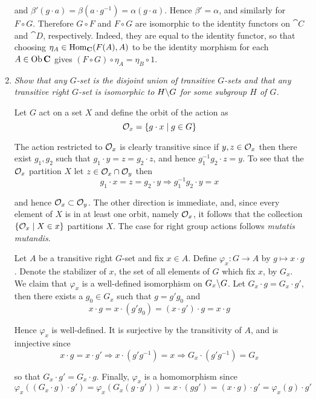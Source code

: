 \documentclass[10pt]{article}
\begin{document}
\begin{enumerate}
and $\beta'(g \cdot a) = \beta(a \cdot g^{-1}) = \alpha(g \cdot a)$.  Hence $\beta' = \alpha$, and similarly for $F \circ G$.  Therefore $G \circ F$ and $F \circ G$ are isomorphic to the identity functors on $\cat{C}$ and $\cat{D}$, respectively.  Indeed, they are equal to the identity functor, so that choosing $\eta_A \in \Hom_\cat{C}(F(A), A)$ to be the identity morphism for each $A \in \Ob\cat{C}$ gives $(F \circ G) \circ \eta_A = \eta_B \circ 1$.

\item \emph{Show that any $G$-set is the disjoint union of transitive $G$-sets and that any transitive right $G$-set is isomorphic to $H \bs G$ for some subgroup $H$ of $G$.}

Let $G$ act on a set $X$ and define the orbit of the action as $$\cal{O}_x = \set{g \cdot x \mid g \in G}$$

The action restricted to $\cal{O}_x$ is clearly transitive since if $y,z \in \cal{O}_x$ then there exist $g_1, g_2$ such that $g_1 \cdot y = z = g_2 \cdot z$, and hence $g_1^{-1}g_2 \cdot z = y$.  To see that the $\cal{O}_x$ partition $X$ let $z \in \cal{O}_x \cap \cal{O}_y$ then
\[
g_1 \cdot x = z = g_2 \cdot y \Rightarrow g_1^{-1}g_2 \cdot y = x
\]

and hence $\cal{O}_x \subset \cal{O}_y$.  The other direction is immediate, and, since every element of $X$ is in at least one orbit, namely $\cal{O}_x$, it follows that the collection $\set{\cal{O}_x \mid X \in x}$ partitions $X$.  The case for right group actions follows \emph{mutatis mutandis}.

Let $A$ be a transitive right $G$-set and fix $x \in A$.  Define $\varphi_x: G \rightarrow A$ by $g \mapsto x \cdot g$.  Denote the stabilizer of $x$, the set of all elements of $G$ which fix $x$, by $G_x$.  We claim that $\varphi_x$ is a well-defined isomorphism on $G_x \bs G$.  Let $G_x \cdot g = G_x \cdot g'$, then there exists a $g_0 \in G_x$ such that $g = g'g_0$ and
\[
x \cdot g = x \cdot (g' g_0) = (x \cdot g') \cdot g = x \cdot g
\]

Hence $\varphi_x$ is well-defined.  It is surjective by the transitivity of $A$, and is innjective since 
\[
x \cdot g = x \cdot g' \Rightarrow x \cdot (g' g^{-1}) = x \Rightarrow G_x \cdot (g' g^{-1}) = G_x
\]

so that $G_x \cdot g' = G_x \cdot g$.  Finally, $\varphi_x$ is a homomorphism since
\[
\varphi_x((G_x \cdot g )\cdot g') = \varphi_x(G_x (g \cdot g')) = x \cdot (g g') = (x \cdot g) \cdot g'  = \varphi_x(g) \cdot g'
\]


\end{enumerate}
\end{document}
